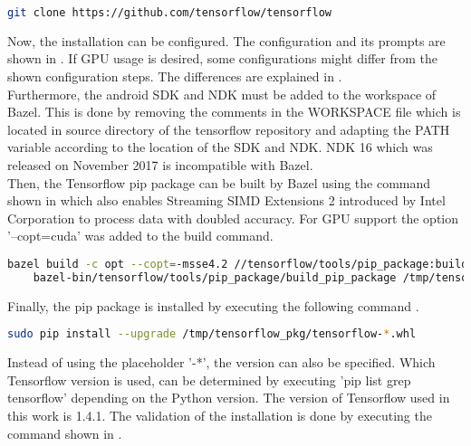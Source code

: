 \begin{lstlisting}[caption=Cloning the tensorflow repository, label=list:clone_tensorflow, language=bash]
	git clone https://github.com/tensorflow/tensorflow		
\end{lstlisting}

Now, the installation can be configured. The configuration and its prompts are shown in . If GPU usage is desired, some configurations might differ from the shown configuration steps. The differences are explained in .\\

Furthermore, the android SDK and NDK must be added to the workspace of Bazel. This is done by removing the comments in the WORKSPACE file which is located in source directory of the tensorflow repository and adapting the PATH variable according to the location of the SDK and NDK. NDK 16 which was released on November 2017 is incompatible with Bazel. \\

Then, the Tensorflow pip package can be built by Bazel using the command shown in  which also enables Streaming SIMD Extensions 2 introduced by Intel Corporation to process data with doubled accuracy. For GPU support the option '--copt=cuda' was added to the build command.

\begin{lstlisting}[caption=Building the Tensorflow pip package, label=list:pip_package, language=bash]
	bazel build -c opt --copt=-msse4.2 //tensorflow/tools/pip_package:build_pip_package
	bazel-bin/tensorflow/tools/pip_package/build_pip_package /tmp/tensorflow_pkg
\end{lstlisting}

Finally, the pip package is installed by executing the following command .

\begin{lstlisting}[caption=Building the Tensorflow pip package, label=list:pip_package, language=bash]
	sudo pip install --upgrade /tmp/tensorflow_pkg/tensorflow-*.whl
\end{lstlisting}

Instead of using the placeholder '-*', the version can also be specified. Which Tensorflow version is used, can be determined by executing 'pip list \big \vert grep tensorflow' depending on the Python version. The version of Tensorflow used in this work is 1.4.1. The validation of the installation is done by executing the command shown in .

